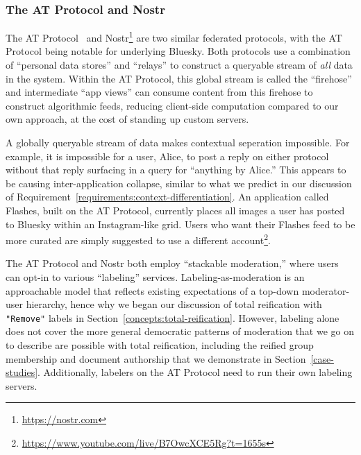 

\subsubsection{The AT Protocol and Nostr}

The AT Protocol~\cite{bluesky} and Nostr\footnote{
\url{https://nostr.com}
} are two similar federated protocols,
with the AT Protocol being notable for underlying Bluesky.
Both protocols use a combination of ``personal data stores'' and ``relays''
to construct a queryable stream of \emph{all} data in the system.
Within the AT Protocol, this global stream is called the ``firehose''
and intermediate ``app views'' can consume content from this firehose to
construct algorithmic feeds, reducing client-side computation compared
to our own approach, at the cost of standing up custom servers.

A globally queryable stream of data makes contextual seperation impossible.
For example, it is impossible for a user, Alice, to post a reply on either protocol
without that reply surfacing in a query for ``anything by Alice.''
This appears to be causing inter-application collapse, similar to
what we predict in our discussion of Requirement~\ref{requirements:context-differentiation}.
An application called Flashes, built on the AT Protocol,
currently places all images a user has posted to Bluesky within
an Instagram-like grid. Users who want their Flashes feed to be
more curated are simply suggested to use a different account\footnote{
    \url{https://www.youtube.com/live/B7OwcXCE5Rg?t=1655s}
}.

The AT Protocol and Nostr both employ ``stackable
moderation,'' where users can opt-in to various ``labeling'' services.
Labeling-as-moderation is an approachable model that reflects existing expectations of a
top-down moderator-user hierarchy,
hence why we began our discussion of total reification
with \texttt{"Remove"} labels in Section~\ref{concepts:total-reification}.
However, labeling alone does not cover the more general democratic patterns
of moderation that we go on to describe are possible with total reification,
including the reified group membership and document authorship
that we demonstrate in Section~\ref{case-studies}.
Additionally, labelers on the AT Protocol need to run their own labeling servers.

